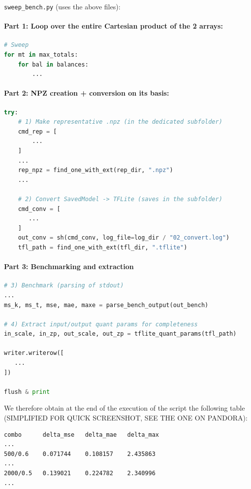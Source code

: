 \texttt{sweep\_bench.py} (uses the above files):

\paragraph{Part 1: Loop over the entire Cartesian product of the 2 arrays:}

\begin{lstlisting}[language=Python]
# Sweep
for mt in max_totals:
    for bal in balances:
        ...
\end{lstlisting}

\paragraph{Part 2: NPZ creation + conversion on its basis:}

\begin{lstlisting}[language=Python]
try:
    # 1) Make representative .npz (in the dedicated subfolder)
    cmd_rep = [
        ...
    ]
    ...
    rep_npz = find_one_with_ext(rep_dir, ".npz")
    ...

    # 2) Convert SavedModel -> TFLite (saves in the subfolder)
    cmd_conv = [
       ...
    ]
    out_conv = sh(cmd_conv, log_file=log_dir / "02_convert.log")
    tfl_path = find_one_with_ext(tfl_dir, ".tflite")
\end{lstlisting}

\paragraph{Part 3: Benchmarking and extraction}

\begin{lstlisting}[language=Python]
# 3) Benchmark (parsing of stdout)
...
ms_k, ms_t, mse, mae, maxe = parse_bench_output(out_bench)

# 4) Extract input/output quant params for completeness
in_scale, in_zp, out_scale, out_zp = tflite_quant_params(tfl_path)

writer.writerow([
   ...
])

flush & print
\end{lstlisting}


We therefore obtain at the end of the execution of the script the following table (SIMPLIFIED FOR QUICK SCREENSHOT, SEE THE ONE ON PANDORA):

\begin{lstlisting}[language=bash]
combo      delta_mse   delta_mae   delta_max
...
500/0.6    0.071744    0.108157    2.435863
...
2000/0.5   0.139021    0.224782    2.340996
...
\end{lstlisting}

